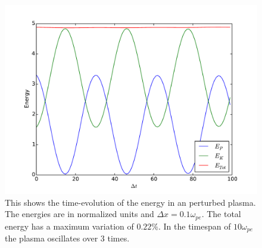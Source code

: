 		\begin{figure}
			\includegraphics[width = \textwidth]{figures/verification/langmuirWave/energyPlot}
			\caption{This shows the time-evolution of the energy in an perturbed plasma. The energies are
			in normalized units and \(\Delta x = 0.1 \omega_{pe}\). The total energy has a maximum variation of \(0.22\%\). In the timespan
			of \(10\omega_{pe}\) the plasma oscillates over \(3\) times.}
		\end{figure}
